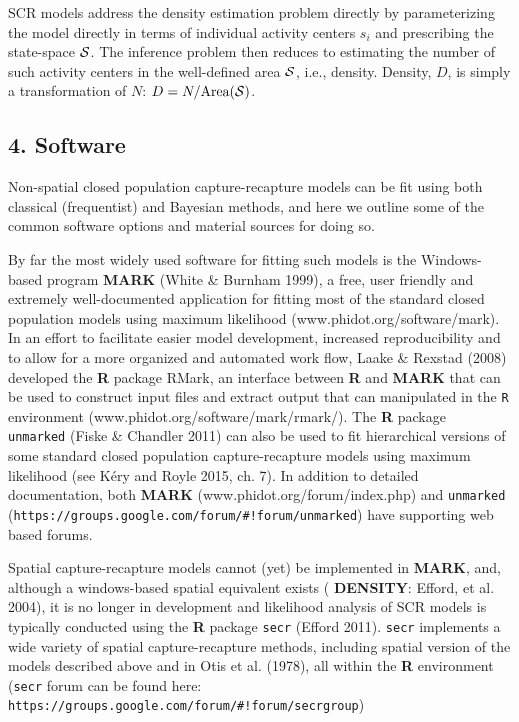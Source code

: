 \documentclass{book}
\begin{document}
SCR models address the density estimation problem directly by
parameterizing the model directly in terms of individual activity
centers $s_i$ and prescribing the state-space ${\cal S}$. The
inference problem then reduces to estimating the number of such
activity centers in the well-defined area ${\cal S}$, i.e., density.
Density, $D$, is simply a transformation of $N$: $D =
N/\mbox{Area}({\cal S})$.

\subsection*{4. Software}

Non-spatial closed population capture-recapture models can be fit
using both classical (frequentist) and Bayesian methods, and here we
outline some of the common software options and material sources for
doing so.

By far the most widely used software for fitting such models is the
Windows-based program {\bf MARK} (White \& Burnham 1999), a free, user
friendly and extremely well-documented application for fitting most of
the standard closed population models using maximum likelihood
(www.phidot.org/software/mark). In an effort to facilitate easier
model development, increased reproducibility and to allow for a more
organized and automated work flow, Laake \& Rexstad (2008) developed
the {\bf R} package {RMark}, an interface between {\bf R} and {\bf
  MARK} that can be used to construct input files and extract output
that can manipulated in the {\tt R} environment
(www.phidot.org/software/mark/rmark/). The {\bf R} package {\tt
  unmarked} (Fiske \& Chandler 2011)
can also be used to fit hierarchical versions of some
standard closed population capture-recapture models using maximum
likelihood (see K\'{e}ry and Royle 2015, ch. 7).
In addition to detailed
documentation, both {\bf MARK} (www.phidot.org/forum/index.php) and
{\tt unmarked}
(\verb|https://groups.google.com/forum/#!forum/unmarked|) have
supporting web based forums.

Spatial capture-recapture models cannot (yet) be implemented in {\bf
  MARK}, and, although a windows-based spatial equivalent exists ({\bf
  DENSITY}: Efford, et al. 2004), it is no longer in development and
likelihood analysis of SCR models is typically conducted using the
{\bf R} package {\tt secr} (Efford 2011). {\tt secr} implements a wide
variety of spatial capture-recapture methods, including spatial
version of the models described above and in Otis et al. (1978), all
within the {\bf R} environment ({\tt secr} forum can be found here:
\verb|https://groups.google.com/forum/#!forum/secrgroup|)
\end{document}
